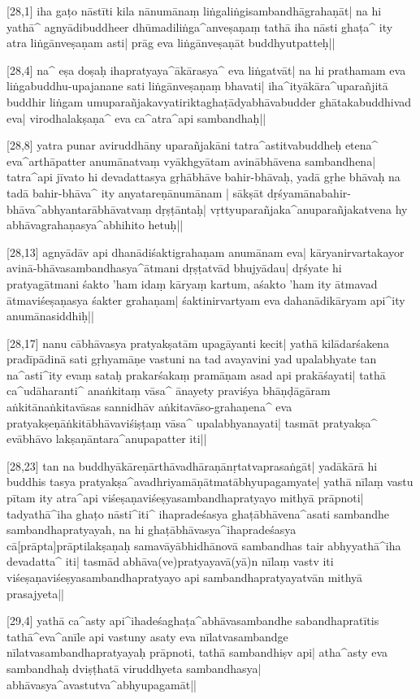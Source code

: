 [28,1] iha gaṭo nāstīti kila nānumānaṃ liṅgaliṅgisambandhāgrahaṇāt| na hi yathā^ agnyādibuddheer dhūmadiliṅga^anveṣaṇaṃ tathā iha nāsti ghaṭa^ ity atra liṅgānveṣaṇam asti| prāg eva liṅgānveṣaṇāt buddhyutpatteḥ||

[28,4] na^ eṣa doṣaḥ ihapratyaya^ākārasya^ eva liṅgatvāt| na hi prathamam eva liṅgabuddhu-upajanane sati liṅgānveṣaṇaṃ bhavati| iha^ityākāra^uparañjitā buddhir liṅgam umuparañjakavyatiriktaghaṭādyabhāvabudder ghātakabuddhivad eva| virodhalakṣaṇa^ eva ca^atra^api sambandhaḥ||

[28,8] yatra punar aviruddhāny uparañjakāni tatra^astitvabuddheḥ etena^ eva^arthāpatter anumānatvaṃ vyākhgyātam avinābhāvena sambandhena| tatra^api jīvato hi devadattasya gṛhābhāve bahir-bhāvaḥ, yadā gṛhe bhāvaḥ na tadā bahir-bhāva^ ity anyatareṇānumānam | sākṣāt dṛśyamānabahir-bhāva^abhyantarābhāvatvaṃ dṛṣṭāntaḥ| vṛttyuparañjaka^anuparañjakatvena hy abhāvagrahaṇasya^abhihito hetuḥ||

[28,13] agnyādāv api dhanādiśaktigrahaṇam anumānam eva| kāryanirvartakayor avinā-bhāvasambandhasya^ātmani dṛṣṭatvād bhujyādau| dṛśyate hi pratyagātmani śakto 'ham idaṃ kāryaṃ kartum, aśakto 'ham ity ātmavad ātmaviśeṣaṇasya śakter grahaṇam| śaktinirvartyam eva dahanādikāryam api^ity anumānasiddhiḥ||

[28,17] nanu cābhāvasya pratyakṣatām upagāyanti kecit| yathā kilādarśakena pradīpādinā sati gṛhyamāṇe vastuni na tad avayavini yad upalabhyate tan na^asti^ity evaṃ sataḥ prakarśakaṃ pramāṇam asad api 
prakāśayati| tathā ca^udāharanti^ anaṅkitaṃ vāsa^ ānayety praviśya bhāṇḍāgāram aṅkitānaṅkitavāsas sannidhāv aṅkitavāso-grahaṇena^ eva 
pratyakṣeṇāṅkitābhāvaviśiṣṭaṃ vāsa^ upalabhyanayati| tasmāt pratyakṣa^ evābhāvo lakṣaṇāntara^anupapatter iti||

[28,23] tan na buddhyākāreṇārthāvadhāraṇānṛtatvaprasaṅgāt| yadākārā hi buddhis tasya pratyakṣa^avadhriyamāṇātmatābhyupagamyate| yathā nīlaṃ vastu pītam ity atra^api viśeṣaṇaviśeṣyasambandhapratyayo mithyā 
prāpnoti| tadyathā^iha ghaṭo nāsti^iti^ ihapradeśasya ghaṭābhāvena^asati sambandhe sambandhapratyayah, na hi ghaṭābhāvasya^ihapradeśasya cā[prāpta]prāptilakṣaṇaḥ samavāyābhidhānovā sambandhas tair abhyyathā^iha devadatta^ iti| tasmād abhāva(ve)pratyayavā(yā)n nīlaṃ vastv iti viśeṣaṇaviśeṣyasambandhapratyayo api sambandhapratyayatvān mithyā prasajyeta||

[29,4] yathā ca^asty api^ihadeśaghaṭa^abhāvasambandhe sabandhapratītis tathā^eva^anīle api vastuny asaty eva nīlatvasambandge nīlatvasambandhapratyayaḥ prāpnoti, tathā sambandhiṣv api| atha^asty eva sambandhaḥ dviṣṭhatā viruddhyeta sambandhasya| abhāvasya^avastutva^abhyupagamāt||

